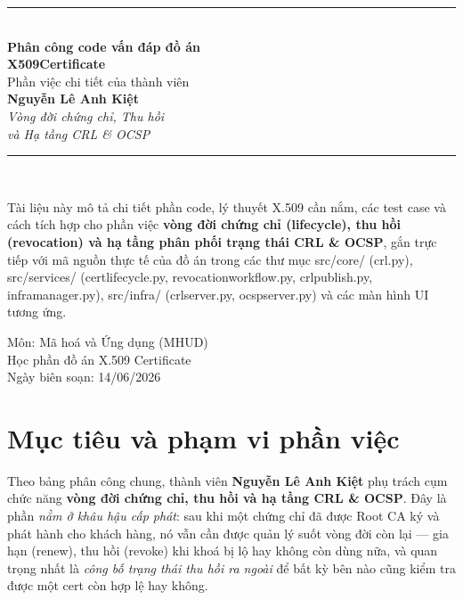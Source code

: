 \documentclass[12pt,a4paper]{article}
\newcommand{\code}[1]{{\ttfamily\small\def\_{\textunderscore\discretionary{}{}{}}#1}}
\begin{document}
\begin{titlepage}
\centering
\vspace*{2.2cm}
{\color{accent}\rule{\linewidth}{1.2pt}}\\[0.6cm]
{\Huge\bfseries Phân công code vấn đáp đồ án}\\[0.35cm]
{\Huge\bfseries\color{accent} X509Certificate}\\[0.5cm]
{\Large Phần việc chi tiết của thành viên}\\[0.3cm]
{\LARGE\bfseries Nguyễn Lê Anh Kiệt}\\[0.45cm]
{\large\itshape Vòng đời chứng chỉ, Thu hồi\\ và Hạ tầng CRL \& OCSP}\\[0.5cm]
{\color{accent}\rule{\linewidth}{1.2pt}}\\[1.4cm]

\begin{minipage}{0.85\linewidth}
\centering\small
Tài liệu này mô tả chi tiết phần code, lý thuyết X.509 cần nắm, các test case
và cách tích hợp cho phần việc \textbf{vòng đời chứng chỉ (lifecycle), thu hồi
(revocation) và hạ tầng phân phối trạng thái CRL \& OCSP}, gắn trực tiếp với mã
nguồn thực tế của đồ án trong các thư mục \code{src/core/} (\code{crl.py}),
\code{src/services/} (\code{cert\_lifecycle.py}, \code{revocation\_workflow.py},
\code{crl\_publish.py}, \code{infra\_manager.py}), \code{src/infra/}
(\code{crl\_server.py}, \code{ocsp\_server.py}) và các màn hình UI tương ứng.
\end{minipage}

\vfill
{\large Môn: Mã hoá và Ứng dụng (MHUD)}\\[0.2cm]
{\large Học phần đồ án X.509 Certificate}\\[0.6cm]
{\small Ngày biên soạn: 14/06/2026}
\end{titlepage}

\tableofcontents
\thispagestyle{fancy}
\clearpage

\section{Mục tiêu và phạm vi phần việc}

Theo bảng phân công chung, thành viên \textbf{Nguyễn Lê Anh Kiệt} phụ trách
cụm chức năng \textbf{vòng đời chứng chỉ, thu hồi và hạ tầng CRL \& OCSP}. Đây
là phần \emph{nằm ở khâu hậu cấp phát}: sau khi một chứng chỉ đã được Root CA
ký và phát hành cho khách hàng, nó vẫn cần được quản lý suốt vòng đời còn lại
--- gia hạn (renew), thu hồi (revoke) khi khoá bị lộ hay không còn dùng nữa, và
quan trọng nhất là \emph{công bố trạng thái thu hồi ra ngoài} để bất kỳ bên nào
cũng kiểm tra được một cert còn hợp lệ hay không.
\end{document}
